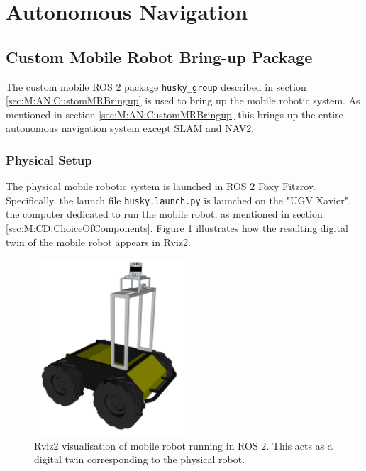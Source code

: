 \section{Autonomous Navigation} \label{sec:R:AutonomousNavigaion}

\subsection{Custom Mobile Robot Bring-up Package}
 The custom mobile ROS 2 package \lstinline{husky_group} described in section \ref{sec:M:AN:CustomMRBringup} is used to bring up the mobile robotic system. As mentioned in section \ref{sec:M:AN:CustomMRBringup} this brings up the entire autonomous navigation system except SLAM and NAV2.
 
 \subsubsection{Physical Setup}
 The physical mobile robotic system is launched in ROS 2 Foxy Fitzroy. Specifically, the launch file \lstinline{husky.launch.py} is launched on the "UGV Xavier", the computer dedicated to run the mobile robot, as mentioned in section \ref{sec:M:CD:ChoiceOfComponents}. Figure \ref{fig:M:AN:MC:digitalTwin} illustrates how the resulting digital twin of the mobile robot appears in Rviz2.

\begin{figure}[H]
  \centering
  \includegraphics[width = 0.5\textwidth]{Figures/figHuskyRviz.pdf}
  \caption{Rviz2 visualisation of mobile robot running in ROS 2. This acts as a digital twin corresponding to the physical robot.}
  \label{fig:M:AN:MC:digitalTwin}
\end{figure}

